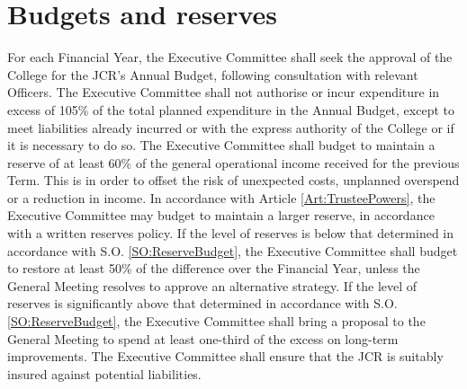 \section{Budgets and reserves}
\npara For each Financial Year, the Executive Committee shall seek the approval of the College for the JCR's Annual Budget, following consultation with relevant Officers. The Executive Committee shall not authorise or incur expenditure in excess of 105\% of the total planned expenditure in the Annual Budget, except to meet liabilities already incurred or with the express authority of the College or if it is necessary to do so.
\npara \label{SO:ReserveBudget} The Executive Committee shall budget to maintain a reserve of at least 60\% of the general operational income received for the previous Term.  This is in order to offset the risk of unexpected costs, unplanned overspend or a reduction in income.  In accordance with Article \ref{Art:TrusteePowers}, the Executive Committee may budget to maintain a larger reserve, in accordance with a written reserves policy. 
\npara If the level of reserves is below that determined in accordance with S.O. \ref{SO:ReserveBudget}, the Executive Committee shall budget to restore at least 50\% of the difference over the Financial Year, unless the General Meeting resolves to approve an alternative strategy.  If the level of reserves is significantly above that determined in accordance with S.O. \ref{SO:ReserveBudget}, the Executive Committee shall bring a proposal to the General Meeting to spend at least one-third of the excess on long-term improvements.
\npara The Executive Committee shall ensure that the JCR is suitably insured against potential liabilities.
